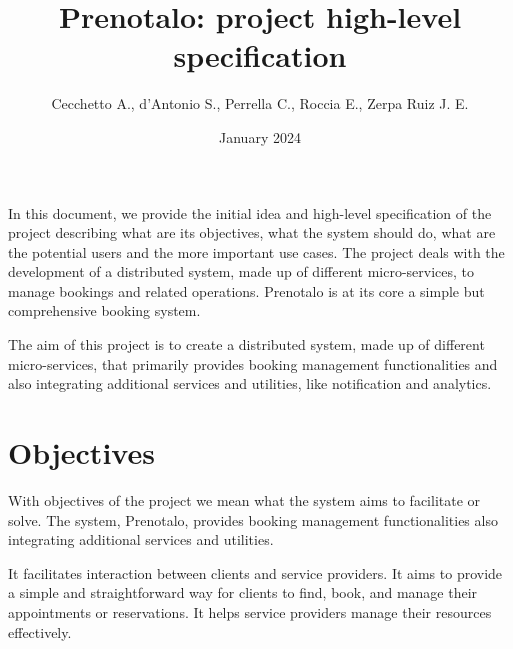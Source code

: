 \documentclass{article}
\title{Prenotalo: project high-level specification}
\author{Cecchetto A., d'Antonio S., Perrella C., Roccia E., Zerpa Ruiz J. E.}
\date{January 2024}
\begin{document}
\maketitle

In this document, we provide the initial idea and high-level specification of the project describing what are its objectives, what the system should do, what are the potential users and the more important use cases. The project deals with the development of a distributed system, made up of different micro-services, to manage bookings and related operations. Prenotalo is at its core a simple but comprehensive booking system.

The aim of this project is to create a distributed system, made up of different
micro-services, that primarily provides booking management functionalities
and also integrating additional services and utilities, like notification and analytics.

\section{Objectives}
With objectives of the project we mean what the system aims to facilitate or solve. The system, Prenotalo, provides booking management functionalities also integrating additional services and utilities.

It facilitates interaction between clients and service providers. It aims to provide a simple and straightforward way for clients to find, book, and manage their appointments or reservations. It helps service providers manage their resources effectively.
\end{document}
